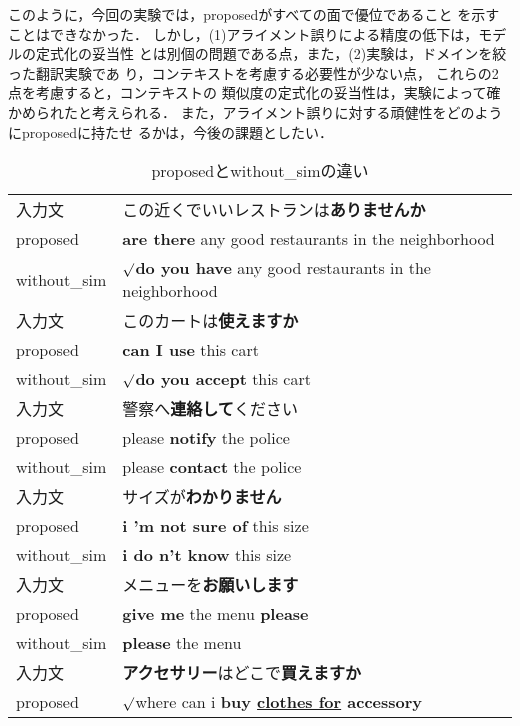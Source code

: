 このように，今回の実験では，{\sc proposed}がすべての面で優位であること
を示すことはできなかった．
しかし，(1)アライメント誤りによる精度の低下は，モデルの定式化の妥当性
とは別個の問題である点，また，(2)実験は，ドメインを絞った翻訳実験であ
り，コンテキストを考慮する必要性が少ない点，
これらの2点を考慮すると，コンテキストの
類似度の定式化の妥当性は，実験によって確かめられたと考えられる．
また，アライメント誤りに対する頑健性をどのように{\sc proposed}に持たせ
るかは，今後の課題としたい．



\begin{table}
\caption{proposedとwithout\_simの違い}
\begin{center}
\label{tWithoutAndWithSim}
\begin{tabular}{ll}
\hline
\hline
入力文             & この近くでいいレストランは\textbf{ありませんか}\\
{\sc proposed}     & \textbf{are there} any good restaurants in the neighborhood\\
{\sc without\_sim} & $\surd$\textbf{do you have} any good restaurants in the neighborhood\\
\hline
入力文             & このカートは\textbf{使えますか}\\
{\sc proposed}     & \textbf{can I use} this cart \\
{\sc without\_sim} & $\surd$\textbf{do you accept} this cart \\
\hline
入力文             & 警察へ\textbf{連絡して}ください\\
{\sc proposed}     & please \textbf{notify} the police\\
{\sc without\_sim} & please \textbf{contact} the police\\
\hline
入力文             & サイズが\textbf{わかりません}\\
{\sc proposed}     & \textbf{i 'm not sure of} this size\\
{\sc without\_sim} & \textbf{i do n't know} this size\\
\hline
入力文             & メニューを\textbf{お願いします}\\
{\sc proposed}     & \textbf{give me} the menu \textbf{please}\\
{\sc without\_sim} & \textbf{please} the menu\\
\hline
入力文             & \textbf{アクセサリー}はどこで\textbf{買えますか}\\
{\sc proposed}     & $\surd$where can i \textbf{buy \underline{clothes for} accessory}\\

\end{tabular}
\end{center}
\end{table}
